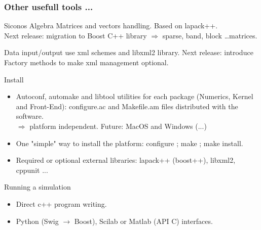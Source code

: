 \frame
{
 \frametitle{Other usefull tools ...}
 \begin{block}{Siconos Algebra}
   Matrices and vectors handling. Based on lapack++. \\
   Next release: migration to Boost C++ library
   $\Rightarrow$ sparse, band, block \ldots matrices. 
 \end{block}
 \pause
 \begin{block}{Data input/output}
   use xml schemes and libxml2 library. Next release: introduce Factory methods to make xml management optional.
 \end{block}
 \pause
 \begin{block}{Install}
   \begin{itemize}
   \item Autoconf, automake and libtool utilities for each package (Numerics, Kernel and Front-End): 
     configure.ac and Makefile.am files distributed with the software. \\
     $\Rightarrow$ platform independent. Future: MacOS and Windows (...) 
   \item One "simple" way to install the platform: configure ; make ; make install. 
   \item Required or optional external libraries: lapack++ (boost++), libxml2, cppunit ...
   \end{itemize}
 \end{block}
 \pause
 \begin{block}{Running a simulation}
   \begin{itemize}
   \item Direct c++ program writing.
   \item Python (Swig $\rightarrow$ Boost), Scilab or Matlab (API C) interfaces. 
   \end{itemize}
 \end{block}
}
